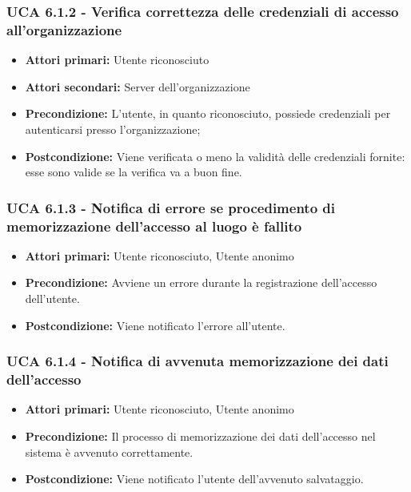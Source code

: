 \subsubsection{UCA 6.1.2 - Verifica correttezza delle credenziali di accesso all'organizzazione}
\begin{itemize}
	\item \textbf{Attori primari:} Utente riconosciuto
	\item \textbf{Attori secondari:} Server dell'organizzazione
	\item \textbf{Precondizione:} L'utente, in quanto riconosciuto, possiede credenziali per autenticarsi presso l'organizzazione;
	\item \textbf{Postcondizione:} Viene verificata o meno la validità delle credenziali fornite: esse sono valide se la verifica va a buon fine.
\end{itemize}

\subsubsection{UCA 6.1.3 - Notifica di errore se procedimento di memorizzazione dell'accesso al luogo è fallito}
\begin{itemize}
	\item \textbf{Attori primari:} Utente riconosciuto, Utente anonimo
	\item \textbf{Precondizione:} Avviene un errore durante la registrazione dell'accesso dell'utente.
	\item \textbf{Postcondizione:} Viene notificato l'errore all'utente.
\end{itemize}

\subsubsection{UCA 6.1.4 - Notifica di avvenuta memorizzazione dei dati dell'accesso}
\begin{itemize}
	\item \textbf{Attori primari:} Utente riconosciuto, Utente anonimo
	\item \textbf{Precondizione:} Il processo di memorizzazione dei dati dell'accesso nel sistema è avvenuto correttamente.
	\item \textbf{Postcondizione:} Viene notificato l'utente dell'avvenuto salvataggio.
\end{itemize}

